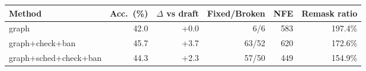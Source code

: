 \begin{tabular}{lrrrrr}
\toprule
Method & Acc.\ (\%) & $\Delta$ vs draft & Fixed/Broken & NFE & Remask ratio \\
\midrule
graph & 42.0 & +0.0 & 6/6 & 583 & 197.4\% \\
graph+check+ban & 45.7 & +3.7 & 63/52 & 620 & 172.6\% \\
graph+sched+check+ban & 44.3 & +2.3 & 57/50 & 449 & 154.9\% \\
\bottomrule
\end{tabular}
